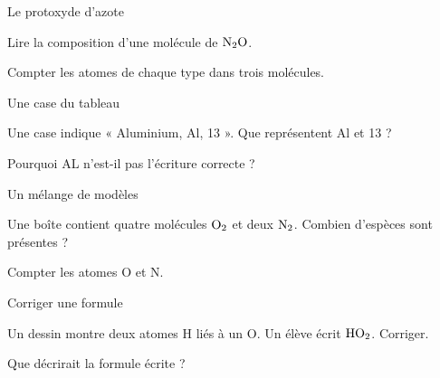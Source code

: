 \par\noindent\begin{minipage}{\linewidth}
\begin{exercice}[2]{Le protoxyde d’azote}
\begin{questions}
\item Lire la composition d’une molécule de $\ce{N2O}$.
\item Compter les atomes de chaque type dans trois molécules.
\end{questions}
\end{exercice}
\end{minipage}
\par\noindent\begin{minipage}{\linewidth}
\begin{exercice}[2]{Une case du tableau}
\begin{questions}
\item Une case indique « Aluminium, Al, 13 ». Que représentent Al et 13 ?
\item Pourquoi AL n’est-il pas l’écriture correcte ?
\end{questions}
\end{exercice}
\end{minipage}
\par\noindent\begin{minipage}{\linewidth}
\begin{exercice}[2]{Un mélange de modèles}
\begin{questions}
\item Une boîte contient quatre molécules $\ce{O2}$ et deux $\ce{N2}$. Combien d’espèces sont présentes ?
\item Compter les atomes O et N.
\end{questions}
\end{exercice}
\end{minipage}
\par\noindent\begin{minipage}{\linewidth}
\begin{exercice}[2]{Corriger une formule}
\begin{questions}
\item Un dessin montre deux atomes H liés à un O. Un élève écrit $\ce{HO2}$. Corriger.
\item Que décrirait la formule écrite ?
\end{questions}
\end{exercice}
\end{minipage}
